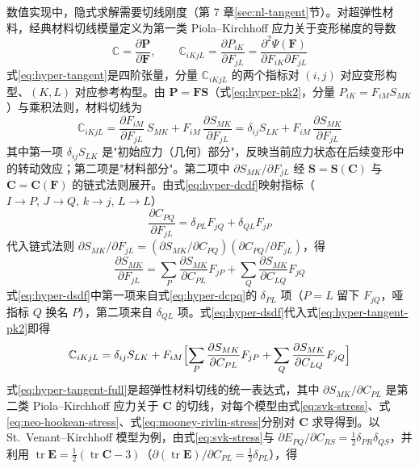 数值实现中，隐式求解需要切线刚度（第 7 章\ref{sec:nl-tangent}节）。对超弹性材料，经典材料切线模量定义为第一类 Piola--Kirchhoff 应力关于变形梯度的导数
\begin{equation}
  \mathbb{C}=\frac{\partial\mathbf{P}}{\partial\mathbf{F}},
  \qquad
  \mathbb{C}_{iKjL}=\frac{\partial P_{iK}}{\partial F_{jL}}
  =\frac{\partial^{2}\Psi(\mathbf{F})}{\partial F_{iK}\partial F_{jL}}
  \label{eq:hyper-tangent}
\end{equation}
式\eqref{eq:hyper-tangent}是四阶张量，分量 $\mathbb{C}_{iKjL}$ 的两个指标对 $(i,j)$ 对应变形构型、$(K,L)$ 对应参考构型。由 $\mathbf{P}=\mathbf{F}\mathbf{S}$（式\eqref{eq:hyper-pk2}，分量 $P_{iK}=F_{iM}S_{MK}$）与乘积法则，材料切线为
\begin{equation}
  \mathbb{C}_{iKjL}
  =\frac{\partial F_{iM}}{\partial F_{jL}}\,S_{MK}+F_{iM}\,\frac{\partial S_{MK}}{\partial F_{jL}}
  =\delta_{ij}S_{LK}+F_{iM}\,\frac{\partial S_{MK}}{\partial F_{jL}}
  \label{eq:hyper-tangent-pk2}
\end{equation}
其中第一项 $\delta_{ij}S_{LK}$ 是"初始应力（几何）部分"，反映当前应力状态在后续变形中的转动效应；第二项是"材料部分"。第二项中 $\partial S_{MK}/\partial F_{jL}$ 经 $\mathbf{S}=\mathbf{S}(\mathbf{C})$ 与 $\mathbf{C}=\mathbf{C}(\mathbf{F})$ 的链式法则展开。由式\eqref{eq:hyper-dcdf}映射指标（$I\to P,\,J\to Q,\,k\to j,\,L\to L$）
\begin{equation}
  \frac{\partial C_{PQ}}{\partial F_{jL}}=\delta_{PL}F_{jQ}+\delta_{QL}F_{jP}
  \label{eq:hyper-dcpq}
\end{equation}
代入链式法则 $\partial S_{MK}/\partial F_{jL}=(\partial S_{MK}/\partial C_{PQ})(\partial C_{PQ}/\partial F_{jL})$，得
\begin{equation}
  \frac{\partial S_{MK}}{\partial F_{jL}}
  =\sum_{P}\frac{\partial S_{MK}}{\partial C_{PL}}F_{jP}
  +\sum_{Q}\frac{\partial S_{MK}}{\partial C_{LQ}}F_{jQ}
  \label{eq:hyper-dsdf}
\end{equation}
式\eqref{eq:hyper-dsdf}中第一项来自式\eqref{eq:hyper-dcpq}的 $\delta_{PL}$ 项（$P=L$ 留下 $F_{jQ}$，哑指标 $Q$ 换名 $P$），第二项来自 $\delta_{QL}$ 项。式\eqref{eq:hyper-dsdf}代入式\eqref{eq:hyper-tangent-pk2}即得
\begin{equation}
  \mathbb{C}_{iKjL}
  =\delta_{ij}S_{LK}+F_{iM}\Bigl[\sum_{P}\frac{\partial S_{MK}}{\partial C_{PL}}F_{jP}
  +\sum_{Q}\frac{\partial S_{MK}}{\partial C_{LQ}}F_{jQ}\Bigr]
  \label{eq:hyper-tangent-full}
\end{equation}
式\eqref{eq:hyper-tangent-full}是超弹性材料切线的统一表达式，其中 $\partial S_{MK}/\partial C_{PL}$ 是第二类 Piola--Kirchhoff 应力关于 $\mathbf{C}$ 的切线，对每个模型由式\eqref{eq:svk-stress}、式\eqref{eq:neo-hookean-stress}、式\eqref{eq:mooney-rivlin-stress}分别对 $\mathbf{C}$ 求导得到。以 St.~Venant--Kirchhoff 模型为例，由式\eqref{eq:svk-stress}与 $\partial E_{PQ}/\partial C_{RS}=\tfrac{1}{2}\delta_{PR}\delta_{QS}$，并利用 $\operatorname{tr}\mathbf{E}=\tfrac{1}{2}(\operatorname{tr}\mathbf{C}-3)$（$\partial(\operatorname{tr}\mathbf{E})/\partial C_{PL}=\tfrac{1}{2}\delta_{PL}$），得
